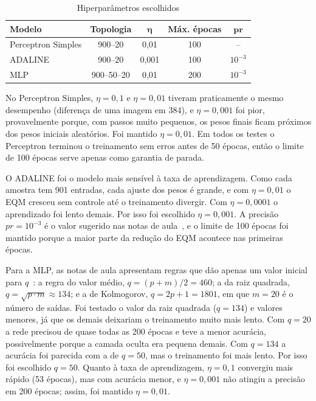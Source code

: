 \documentclass[conference]{IEEEtran}
\begin{document}
\begin{table}[htbp]
\caption{Hiperparâmetros escolhidos}
\begin{center}
\begin{tabular}{|l|c|c|c|c|}
\hline
\textbf{Modelo} & \textbf{Topologia} & $\boldsymbol{\eta}$ & \textbf{Máx. épocas} & $\boldsymbol{pr}$ \\
\hline
Perceptron Simples & 900--20 & 0,01 & 100 & -- \\
\hline
ADALINE & 900--20 & 0,001 & 100 & $10^{-3}$ \\
\hline
MLP & 900--50--20 & 0,01 & 200 & $10^{-3}$ \\
\hline
\end{tabular}
\label{tab:hiper}
\end{center}
\end{table}

No Perceptron Simples, $\eta = 0{,}1$ e $\eta = 0{,}01$ tiveram praticamente
o mesmo desempenho (diferença de uma imagem em 384), e $\eta = 0{,}001$ foi
pior, provavelmente porque, com passos muito pequenos, os pesos finais
ficam próximos dos pesos iniciais aleatórios. Foi mantido $\eta = 0{,}01$.
Em todos os testes o Perceptron terminou o treinamento sem erros antes de
50 épocas, então o limite de 100 épocas serve apenas como garantia de
parada.

O ADALINE foi o modelo mais sensível à taxa de aprendizagem. Como cada
amostra tem 901 entradas, cada ajuste dos pesos é grande, e com
$\eta = 0{,}01$ o EQM cresceu sem controle até o treinamento divergir. Com
$\eta = 0{,}0001$ o aprendizado foi lento demais. Por isso foi escolhido
$\eta = 0{,}001$. A precisão $pr = 10^{-3}$ é o valor sugerido nas
notas de aula~\cite{b1}, e o limite de 100 épocas foi mantido porque a
maior parte da redução do EQM acontece nas primeiras épocas.

Para a MLP, as notas de aula apresentam regras que dão apenas um valor
inicial para $q$~\cite{b1}: a regra do valor médio, $q = (p+m)/2 = 460$; a
da raiz quadrada, $q = \sqrt{p \cdot m} \approx 134$; e a de Kolmogorov,
$q = 2p + 1 = 1801$, em que $m = 20$ é o número de saídas. Foi testado o
valor da raiz quadrada ($q = 134$) e valores menores, já que os demais
deixariam o treinamento muito mais lento. Com $q = 20$ a rede precisou de
quase todas as 200 épocas e teve a menor acurácia, possivelmente porque a
camada oculta era pequena demais. Com $q = 134$ a acurácia foi parecida com
a de $q = 50$, mas o treinamento foi mais lento. Por isso foi escolhido
$q = 50$. Quanto à taxa de aprendizagem, $\eta = 0{,}1$ convergiu mais
rápido (53 épocas), mas com acurácia menor, e $\eta = 0{,}001$ não atingiu a
precisão em 200 épocas; assim, foi mantido $\eta = 0{,}01$.
\end{document}
